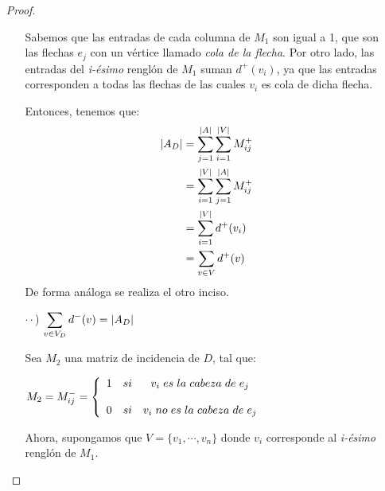\documentclass{article}
\begin{document}
\begin{enumerate}
\begin{proof}
\begin{itemize}
      Sabemos que las entradas de cada columna de $M_{1}$ son igual a 1,
      que son las flechas $e_{j}$ con un vértice llamado \textit{cola de la flecha}.
      Por otro lado, las entradas del \textit{i-ésimo} renglón de $M_{1}$
      suman $d^{+}(v_{i})$, ya que las entradas corresponden a todas las
      flechas de las cuales $v_{i}$ es cola de dicha flecha. 
      
      Entonces, tenemos que:
      \begin{equation*}
        \begin{split}
          \abs{A_{D}} & = \sum_{j=1}^{\abs{A}} \sum_{i=1}^{\abs{V}} M^{+}_{ij} \\
          & = \sum_{i=1}^{\abs{V}} \sum_{j=1}^{\abs{A}} M^{+}_{ij} \\
          & = \sum_{i=1}^{\abs{V}} d^{+}(v_{i}) \\
          & = \sum_{v \in V} d^{+}(v)
        \end{split}
      \end{equation*}
      De forma análoga se realiza el otro inciso.
      
    \item[$\cdot\cdot$)] $\displaystyle \sum_{v \in V_{D}} d^{-}(v) = \abs{A_{D}}$ 
      
      Sea $M_{2}$ una matriz de incidencia de $D$, tal que:
      \begin{center}
        $M_{2} = M^{-}_{ij}
        = \left \{ 
        \begin{array}{lcc}
          1 &   si  & v_{i} \hspace{0.3em} es \hspace{0.3em} la \hspace{0.3em}
          cabeza \hspace{0.3em} de \hspace{0.3em} e_{j} \\
          \\0 &  si & v_{i} \hspace{0.3em} no \hspace{0.3em} es \hspace{0.3em}
          la \hspace{0.3em} cabeza \hspace{0.3em} de \hspace{0.3em} e_{j}
        \end{array}
        \right.$
      \end{center}
      Ahora, supongamos que $V = \{v_{1}, \cdots, v_{n}\}$ donde $v_{i}$
      corresponde al \textit{i-ésimo} renglón de $M_{1}$.
      

\end{itemize}
\end{proof}
\end{enumerate}
\end{document}
